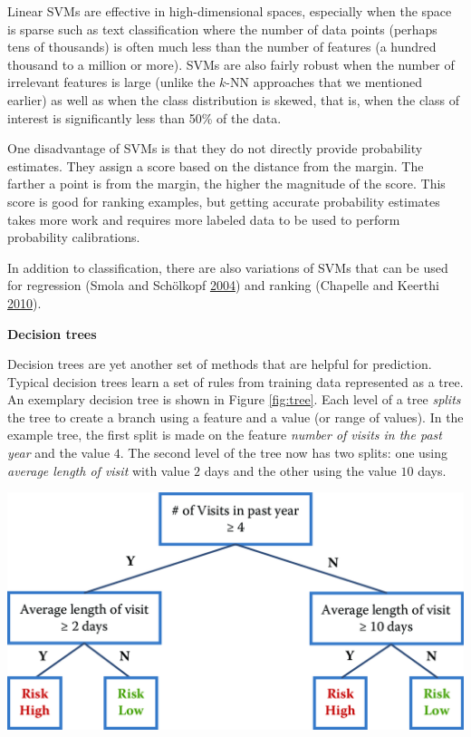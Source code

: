 \documentclass[]{krantz}
\begin{document}
Linear SVMs are effective in high-dimensional spaces, especially when
the space is sparse such as text classification where the number of data
points (perhaps tens of thousands) is often much less than the number of
features (a hundred thousand to a million or more). SVMs are also fairly
robust when the number of irrelevant features is large (unlike the
\(k\)-NN approaches that we mentioned earlier) as well as when the class
distribution is skewed, that is, when the class of interest is
significantly less than 50\% of the data.

One disadvantage of SVMs is that they do not directly provide
probability estimates. They assign a score based on the distance from
the margin. The farther a point is from the margin, the higher the
magnitude of the score. This score is good for ranking examples, but
getting accurate probability estimates takes more work and requires more
labeled data to be used to perform probability calibrations.

In addition to classification, there are also variations of SVMs that
can be used for regression (Smola and Schölkopf
\protect\hyperlink{ref-SmolaRegression04}{2004}) and ranking (Chapelle
and Keerthi \protect\hyperlink{ref-Chapelle2010}{2010}).

\textbf{Decision trees}

Decision trees are yet another set of methods that are helpful for
prediction. Typical decision trees learn a set of rules from training
data represented as a tree. An exemplary decision tree is shown in
Figure \ref{fig:tree}. Each level of a tree \emph{splits} the tree to
create a branch using a feature and a value (or range of values). In the
example tree, the first split is made on the feature \emph{number of
visits in the past year} and the value \(4\). The second level of the
tree now has two splits: one using \emph{average length of visit} with
value \(2\) days and the other using the value \(10\) days.

\begin{center}\includegraphics[width=0.7\linewidth]{ChapterML/figures/tree} \end{center}
\end{document}
